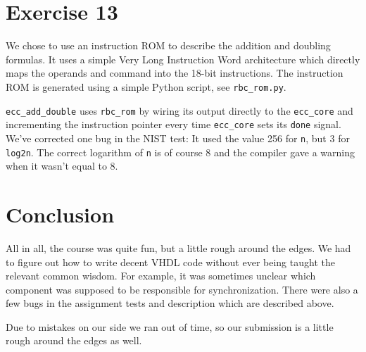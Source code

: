 \documentclass[a4paper,twoside]{article}
\newcommand{\atom}[1]{\mbox{\texttt{#1}}}
\begin{document}
\section*{Exercise 13}
We chose to use an instruction ROM to describe the addition and doubling
formulas. It uses a simple Very Long Instruction Word architecture which
directly maps the operands and command into the 18-bit instructions. The
instruction ROM is generated using a simple Python script, see
\atom{rbc\_rom.py}.

\atom{ecc\_add\_double} uses \atom{rbc\_rom} by wiring its output directly to
the \atom{ecc\_core} and incrementing the instruction pointer every time
\atom{ecc\_core} sets its \atom{done} signal. We've corrected one bug in the
NIST test: It used the value 256 for \atom{n}, but 3 for \atom{log2n}. The
correct logarithm of \atom{n} is of course 8 and the compiler gave a warning
when it wasn't equal to 8.

\section*{Conclusion}

All in all, the course was quite fun, but a little rough around the edges. We
had to figure out how to write decent VHDL code without ever being taught the
relevant common wisdom. For example, it was sometimes unclear which component
was supposed to be responsible for synchronization. There were also a few bugs
in the assignment tests and description which are described above.

Due to mistakes on our side we ran out of time, so our submission is a little
rough around the edges as well.
\end{document}
